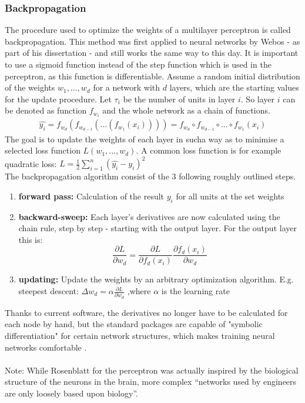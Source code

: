 \documentclass[11pt,a4paper]{article}
\begin{document}
\subsubsection{Backpropagation}
The procedure used to optimize the weights of a multilayer perceptron is called backpropagation. This method was first applied to neural networks by Webos - as part of his dissertation \cite{Werbos1974}- and still works the same way to this day. It is important to use a sigmoid function instead of the step function which is used in the perceptron, as this function is differentiable.  Assume a random initial distribution of the weights $w_1,\dots,w_d$ for a network with $d$ layers, which are the starting values for the update procedure. Let $\tau_i$ be the number of units in layer $i$. So layer $i$ can be denoted as function $f_{w_i}$ and the whole network as a chain of functions.
\begin{align}\label{network_chain}
	\hat{y_i}=f_{w_d}(f_{w_{d-1}}(...(f_{w_1}(x_i))))=f_{w_d}\circ f_{w_{d-1}} \circ \dots \circ f_{w_1}(x_i)
\end{align}
The goal is to update the weights of each layer in sucha way as to minimise a selected loss function $L(w_1,\dots,w_d)$. A common loss function is for example quadratic loss: $L=\frac{1}{2}\sum_{i=1}^n(\hat{y_i}-y_i)^2$\\
The backpropagation algorithm consist of the 3 following roughly outlined steps.
\begin{enumerate}
	\item \textbf{forward pass:} Calculation of the result $y_i$ for all units at the set weights
	\item \textbf{backward-sweep:} Each layer's derivatives are now calculated using the chain rule, step by step - starting with the output layer. For the output layer this is:
	\[\frac{\partial L}{\partial w_d}=\frac{\partial L}{\partial f_d(x_i)}\frac{\partial f_d(x_i)}{\partial w_d}	\]
	\item \textbf{updating:} Update the weights by an arbitrary optimization algorithm. E.g. steepest descent:
	$\Delta w_d=\alpha \frac{\partial L}{\partial w_d}$
	,where $\alpha$ is the learning rate
\end{enumerate}
Thanks to current software, the derivatives no longer have to be calculated for each node by hand, but the standard packages are capable of "symbolic differentiation" for certain network structures, which makes training neural networks comfortable \cite[p. 47]{Chollet2018}.\\
\ \\
Note: While Rosenblatt for the perceptron was actually inspired by the biological structure of the neurons in the brain, more complex “networks used by engineers are only loosely based upon biology”\cite{Hecht-Nielsen1988}.
\end{document}
